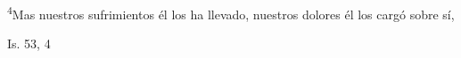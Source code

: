 \documentclass[../../rosario.tex]{subfiles}
\begin{document}
    \textsuperscript{4}Mas nuestros sufrimientos él los ha llevado, nuestros dolores él los cargó sobre sí,
    \begin{flushright}
    Is. 53, 4
    \end{flushright}
\end{document}
